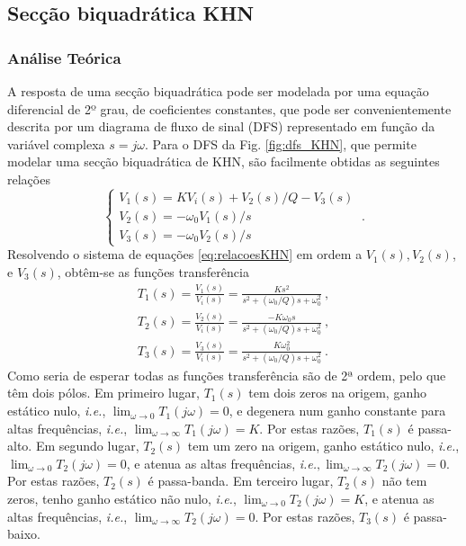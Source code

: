 \subsection{Secção biquadrática KHN}

\subsubsection{Análise Teórica}
A resposta de uma secção biquadrática pode ser modelada por uma equação diferencial de 2º grau, de coeficientes constantes, que pode ser convenientemente descrita por um diagrama de fluxo de sinal (DFS) representado em função da variável complexa $s = j\omega$. Para o DFS da Fig. \ref{fig:dfs_KHN}, que permite modelar uma secção biquadrática de KHN, são facilmente obtidas as seguintes relações
\begin{equation}\label{eq:relacoesKHN}
    \begin{cases}
    V_1(s) = K V_i(s) + V_2(s)/Q - V_3(s) \\
    V_2(s) = -\omega_0 V_1(s)/s\\
    V_3(s) = -\omega_0 V_2(s)/s
    \end{cases}\:.
\end{equation}
Resolvendo o sistema de equações \eqref{eq:relacoesKHN} em ordem a $V_1(s), V_2(s)$, e $V_3(s)$, obtêm-se as funções transferência
\begin{equation}\label{eq:tfKHN}
\begin{split}
    T_1(s) = \frac{V_1(s)}{V_i(s)} =\frac{Ks^2}{s^2+(\omega_0/Q)s+\omega_0^2}\:, \\ 
    T_2(s) = \frac{V_2(s)}{V_i(s)} =\frac{-K\omega_0 s}{s^2+(\omega_0/Q)s+\omega_0^2}\:, \\
    T_3(s) = \frac{V_3(s)}{V_i(s)} =\frac{K\omega_0^2}{s^2+(\omega_0/Q)s+\omega_0^2} \:.
    \end{split}
\end{equation}
Como seria de esperar todas as funções transferência são de 2ª ordem, pelo que têm dois pólos. Em primeiro lugar, $T_1(s)$ tem dois zeros na origem, ganho estático nulo, \textit{i.e.}, $\lim_{\omega \rightarrow 0} T_1(j\omega) = 0$, e degenera num ganho constante para altas frequências, \textit{i.e.}, $\lim_{\omega \rightarrow \infty} T_1(j\omega) = K$. Por estas razões, $T_1(s)$ é passa-alto. Em segundo lugar, $T_2(s)$ tem um zero na origem, ganho estático nulo, \textit{i.e.}, $\lim_{\omega \rightarrow 0} T_2(j\omega) = 0$, e atenua as altas frequências, \textit{i.e.}$, \lim_{\omega \rightarrow \infty} T_2(j\omega) = 0$. Por estas razões, $T_2(s)$ é passa-banda. Em terceiro lugar, $T_2(s)$ não tem zeros, tenho ganho estático não nulo, \textit{i.e.}, $\lim_{\omega \rightarrow 0} T_2(j\omega) = K$, e atenua as altas frequências, \textit{i.e.}, $\lim_{\omega \rightarrow \infty} T_2(j\omega) = 0$. Por estas razões, $T_3(s)$ é passa-baixo. 

